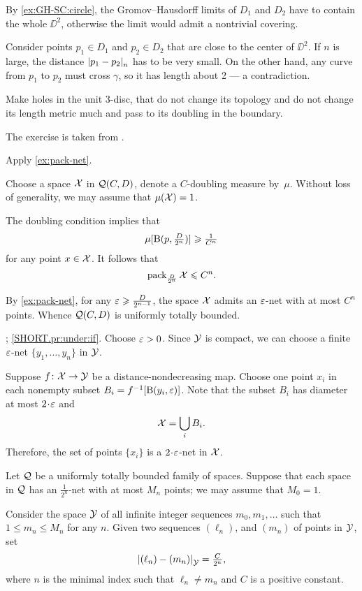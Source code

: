 By \ref{ex:GH-SC:circle}, the Gromov--Hausdorff limits of $D_1$ and $D_2$ have to contain the whole $\DD^2$, otherwise the limit would admit a nontrivial covering.

Consider points $p_1\in D_1$ and $p_2\in D_2$ that are close to the center of $\DD^2$.
If $n$ is large, the distance $\dist{p_1}{p_2}{n}$ has to be very small.
On the other hand, any curve from $p_1$ to $p_2$ must cross $\gamma$, so it has length about 2 --- a contradiction.

Make holes in the unit 3-disc, that do not change its topology and do not change its length metric much 
and pass to its doubling in the boundary.

 The exercise is taken from \cite{burago-burago-ivanov}.

 Apply \ref{ex:pack-net}.

Choose a space $\mathcal{X}$ in $\mathcal{Q}(C,D)$, denote a $C$-doubling measure by~$\mu$.
Without loss of generality, we may assume that $\mu(\spc{X})\z=1$.

The doubling condition implies that 
\[\mu[\mathrm{B}{}(p,\tfrac D{2^n})]\geqslant\tfrac 1{C^n}\]
for any point $x\in \mathcal{X}$.
It follows that 
\[\operatorname{\rm pack}\nolimits_{\frac D{2^n}}\mathcal{X}\leqslant C^n.\]

By \ref{ex:pack-net}, for any $\varepsilon\geqslant\frac D{2^{n-1}}$, the space $\mathcal{X}$ admits an $\varepsilon$-net with at most $C^n$ points.
Whence $\mathcal{Q}(C,D)$ is uniformly totally bounded.

\parbf{\ref{pr:under}}; \ref{SHORT.pr:under:if}.
Choose $\varepsilon>0$.
Since $\mathcal{Y}$ is compact, we can choose a finite $\varepsilon$-net $\{y_1,\dots,y_{n}\}$ in $\mathcal{Y}$.

Suppose $f\colon\mathcal{X}\to \mathcal{Y}$ be a distance-nondecreasing map.
Choose one point $x_i$ in each nonempty subset $B_i=f^{-1}[\mathrm{B}{}(y_i,\varepsilon)]$.
Note that the subset $B_i$ has diameter at most $2\cdot \eps$ and 
\[\mathcal{X}=\bigcup_iB_i.\]
Therefore, the set of points $\{x_i\}$ is a $2\cdot\eps$-net in $\mathcal{X}$.

 Let $\mathcal{Q}$ be a uniformly totally bounded family of spaces. 
Suppose that each space in $\mathcal{Q}$ has an $\tfrac1{2^n}$-net with at most $M_n$ points; we may assume that $M_0=1$.

Consider the space $\mathcal{Y}$ of all infinite integer sequences $m_0,m_1,\dots$ such that $1\le m_n\le M_n$ for any $n$.
Given two sequences $(\ell_n)$, and $(m_n)$ of points in $\mathcal{Y}$, set 
\[\dist{(\ell_n)}{(m_n)}{\spc{Y}}=\tfrac C{2^{n}},\]
where $n$ is the minimal index such that $\ell_n\ne m_n$ and $C$ is a positive constant.

